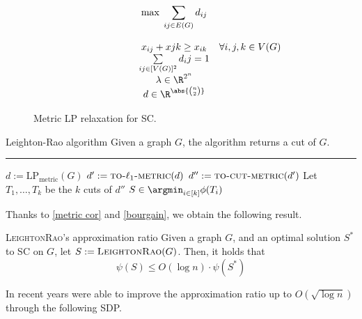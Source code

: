 \documentclass[a4paper, 12pt]{report}
\begin{document}
    \begin{figure}[H]
        \centering
        \[\begin{array}{ccl}
            \qquad\qquad\quad
            & \max \; \displaystyle \sum_{ij \in E(G)}{d_{ij}} \\\\
            & x_{ij} + x{jk} \ge x_{ik} & \forall i, j ,k \in V(G) \\
            & \sum\limits_{ij \in [V(G)]^2}{d_ij} = 1 \\
            & \lambda \in \R^{2^n} \\
            & d \in \R^{\abs{\binom{n}{2}}} \\
        \end{array}\]
        \caption{Metric LP relaxation for SC.}
    \end{figure}

    \begin{framedalgo}{Leighton-Rao algorithm}
        Given a graph $G$, the algorithm returns a cut of $G$. \\
        \hrule

        \quad
        \begin{algorithmic}[1]
                \State $d := \mathrm{LP}_\mathrm{metric}(G)$
                \State $d' := \textsc{to-}\ell_1\textsc{-metric}(d)$ 
                \State $d'' := \textsc{to-cut-metric}(d')$ 
                \State Let $T_1, \ldots, T_k$ be the $k$ cuts of $d''$
                \State {} $\displaystyle S \in \argmin_{i \in [k]}{\phi(T_i)}$
            \EndFunction
        \end{algorithmic}
    \end{framedalgo}
    
    Thanks to \cref{metric cor} and \cref{bourgain}, we obtain the following result.

    \begin{framedthm}{\textsc{LeightonRao}'s approximation ratio}
        Given a graph $G$, and an optimal solution $S^*$ to SC on $G$, let $S := \textsc{LeightonRao}(G)$. Then, it holds that $$\psi(S) \le O(\log n) \cdot \psi(S^*)$$
    \end{framedthm}
    
    In recent years \textcite{arora} were able to improve the approximation ratio up to $O(\sqrt{\log n})$ through the following SDP.
\end{document}

